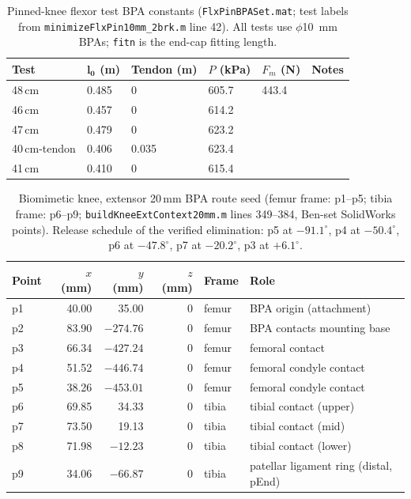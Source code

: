 \begin{table}
\caption{Pinned-knee flexor test BPA constants (\texttt{FlxPinBPASet.mat}; test labels from \texttt{minimizeFlxPin10mm\_2brk.m} line 42). All tests use $\phi$\qty{10}{\mm} BPAs; \texttt{fitn} is the end-cap fitting length.}
\label{tab:app_flxpin_tests}
\begin{tabular}{@{}llllll@{}}
\toprule
\textbf{Test} & $\boldsymbol{l_{0}}$ (m) & Tendon (m) & $P$ (kPa) & $F_{m}$ (N) & \textbf{Notes} \\
\midrule
48\,cm        & 0.485 & 0     & 605.7 & 443.4 & \\
46\,cm        & 0.457 & 0     & 614.2 &       & \\
47\,cm        & 0.479 & 0     & 623.2 &       & \\
40\,cm-tendon & 0.406 & 0.035 & 623.4 &       & \\
41\,cm        & 0.410 & 0     & 615.4 &       & \\
\bottomrule
\end{tabular}
\end{table}

\begin{table}
\caption{Biomimetic knee, extensor 20\,mm BPA route seed (femur frame: p1--p5; tibia frame: p6--p9; \texttt{buildKneeExtContext20mm.m} lines 349--384, Ben-set SolidWorks points). Release schedule of the verified elimination: p5 at $-91.1^{\circ}$, p4 at $-50.4^{\circ}$, p6 at $-47.8^{\circ}$, p7 at $-20.2^{\circ}$, p3 at $+6.1^{\circ}$.}
\label{tab:app_ext_seed}
\begin{tabular}{@{}lrrrll@{}}
\toprule
\textbf{Point} & $x$ (mm) & $y$ (mm) & $z$ (mm) & \textbf{Frame} & \textbf{Role} \\
\midrule
p1 & 40.00 & 35.00  & 0 & femur & BPA origin (attachment) \\
p2 & 83.90 & $-274.76$ & 0 & femur & BPA contacts mounting base \\
p3 & 66.34 & $-427.24$ & 0 & femur & femoral contact \\
p4 & 51.52 & $-446.74$ & 0 & femur & femoral condyle contact \\
p5 & 38.26 & $-453.01$ & 0 & femur & femoral condyle contact \\
p6 & 69.85 & 34.33  & 0 & tibia & tibial contact (upper) \\
p7 & 73.50 & 19.13  & 0 & tibia & tibial contact (mid) \\
p8 & 71.98 & $-12.23$ & 0 & tibia & tibial contact (lower) \\
p9 & 34.06 & $-66.87$ & 0 & tibia & patellar ligament ring (distal, pEnd) \\
\bottomrule
\end{tabular}
\end{table}

